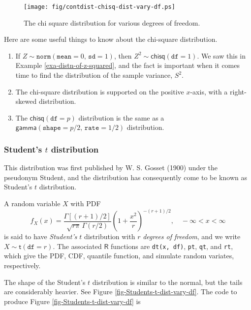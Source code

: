 \begin{figure}[ht!]
\centering
\texttt{[image: fig/contdist-chisq-dist-vary-df.ps]}
\caption[Chi square distribution for various degrees of freedom]{\label{fig-chisq-dist-vary-df}\small The chi square distribution for various degrees of freedom.}
\end{figure}

\begin{rem}
Here are some useful things to know about the chi-square distribution.
\begin{enumerate}
\item If \(Z\sim\mathtt{norm}(\mathtt{mean}=0,\,\mathtt{sd}=1)\), then
\(Z^{2}\sim\mathsf{chisq}(\mathtt{df}=1)\). We saw this in Example
\ref{exa-distn-of-z-squared}, and the fact is important when it
comes time to find the distribution of the sample variance,
\(S^{2}\).
\item The chi-square distribution is supported on the positive
\(x\)-axis, with a right-skewed distribution.
\item The \(\mathsf{chisq}(\mathtt{df}=p)\) distribution is the same as a
\(\mathsf{gamma}(\mathtt{shape}=p/2,\,\mathtt{rate}=1/2)\)
distribution.
\end{enumerate}
\end{rem}

\subsubsection{Student's \(t\) distribution}
\label{sec-6-5-2-2}

This distribution was first published by W. S. Gosset (1900) under the pseudonym Student, and the distribution has consequently come to be known as Student's \(t\) distribution.

A random variable \(X\) with PDF
\begin{equation}
f_{X}(x) = \frac{\Gamma\left[ (r+1)/2\right] }{\sqrt{r\pi}\,\Gamma(r/2)}\left( 1 + \frac{x^{2}}{r} \right)^{-(r+1)/2},\quad -\infty < x < \infty
\end{equation}
is said to have \emph{Student's} \(t\) distribution with \(r\) \emph{degrees of
freedom}, and we write \(X\sim\mathsf{t}(\mathtt{df}=r)\). The
associated \(\mathsf{R}\) functions are \texttt{dt(x, df)}, \texttt{pt}, \texttt{qt}, and \texttt{rt},
which give the PDF, CDF, quantile function, and simulate random
variates, respectively.

The shape of the Student's \(t\) distribution is similar to the normal, but the tails are considerably heavier.
See Figure \ref{fig-Students-t-dist-vary-df}.
The code to produce Figure \ref{fig-Students-t-dist-vary-df} is

